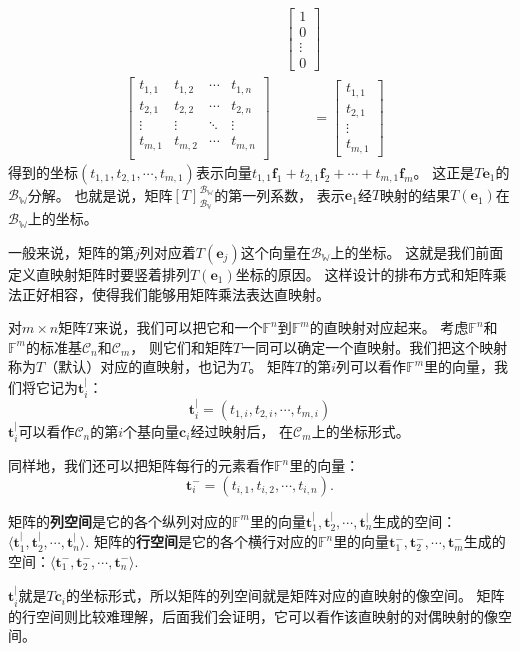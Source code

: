 \documentclass[12pt,UTF8,fontset=none]{ctexbook}
\begin{document}
\begin{align*}
    & \begin{bmatrix}1\\ 0 \\ \vdots \\0 \end{bmatrix} &  \\
        \begin{bmatrix}
            t_{1,1}    & t_{1,2}   & \cdots & t_{1,n} \\
            t_{2,1}    & t_{2,2}   & \cdots & t_{2,n} \\
            \vdots     & \vdots    & \ddots & \vdots  \\
            t_{m,1}    & t_{m,2}   & \cdots & t_{m,n} \\
           \end{bmatrix} \,& \quad\quad = \begin{bmatrix} t_{1,1}\\ t_{2,1}\\ \vdots \\ t_{m,1} \end{bmatrix} 
\end{align*}
得到的坐标$(t_{1,1},  t_{2,1},  \cdots , t_{m,1})$表示向量$ t_{1,1}\mathbf{f}_1 + t_{2,1}\mathbf{f}_2 + \cdots + t_{m,1}\mathbf{f}_m$。
这正是$ T\mathbf{e}_1$的$\mathcal{B}_{\mathbb{W}}$分解。
也就是说，矩阵$[T]_{\mathcal{B}_{\mathbb{V}}}^{\mathcal{B}_{\mathbb{W}}}$的第一列系数，
表示$\mathbf{e}_1$经$T$映射的结果$T(\mathbf{e}_1)$在$\mathcal{B}_{\mathbb{W}}$上的坐标。

一般来说，矩阵的第$j$列对应着$T(\mathbf{e}_j)$这个向量在$\mathcal{B}_{\mathbb{W}}$上的坐标。
这就是我们前面定义直映射矩阵时要竖着排列$T(\mathbf{e}_1)$坐标的原因。
这样设计的排布方式和矩阵乘法正好相容，使得我们能够用矩阵乘法表达直映射。

对$m \times n$矩阵$T$来说，我们可以把它和一个$\mathbb{F}^n$到$\mathbb{F}^m$的直映射对应起来。
考虑$\mathbb{F}^n$和$\mathbb{F}^m$的标准基$\mathcal{C}_{n}$和$\mathcal{C}_{m}$，
则它们和矩阵$T$一同可以确定一个直映射。我们把这个映射称为$T$（默认）对应的直映射，也记为$T$。
矩阵$T$的第$i$列可以看作$\mathbb{F}^m$里的向量，我们将它记为$\mathbf{t}_i^|$：
$$\mathbf{t}_i^| = (t_{1,i}, t_{2,i}, \cdots, t_{m,i})$$
$\mathbf{t}_i^|$可以看作$\mathcal{C}_{n}$的第$i$个基向量$\mathbf{c}_i$经过映射后，
在$\mathcal{C}_{m}$上的坐标形式。

同样地，我们还可以把矩阵每行的元素看作$\mathbb{F}^n$里的向量：
$$ \mathbf{t}_i^- = (t_{i,1}, t_{i,2}, \cdots, t_{i,n}).$$
\begin{df}\label{df:4_1_0}
    矩阵的\textbf{列空间}是它的各个纵列对应的$\mathbb{F}^m$里的向量$\mathbf{t}_1^|, \mathbf{t}_2^|, \cdots , \mathbf{t}_n^|$生成的空间：$\langle \mathbf{t}_1^|, \mathbf{t}_2^|, \cdots , \mathbf{t}_n^| \rangle$. 
    矩阵的\textbf{行空间}是它的各个横行对应的$\mathbb{F}^n$里的向量$\mathbf{t}_1^-, \mathbf{t}_2^-, \cdots , \mathbf{t}_m^-$生成的空间：$\langle \mathbf{t}_1^-, \mathbf{t}_2^-, \cdots , \mathbf{t}_n^- \rangle$. 
\end{df}
$\mathbf{t}_i^|$就是$T\mathbf{c}_i$的坐标形式，所以矩阵的列空间就是矩阵对应的直映射的像空间。
矩阵的行空间则比较难理解，后面我们会证明，它可以看作该直映射的对偶映射的像空间。
\end{document}
